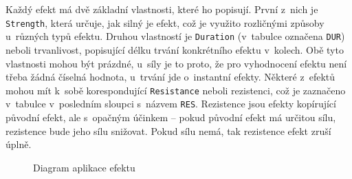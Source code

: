 Každý efekt má dvě základní vlastnosti, které ho popisují. První z~nich je \texttt{Strength}, která určuje, jak silný je efekt, což je využito rozličnými způsoby u~různých typů efektu. Druhou vlastností je \texttt{Duration} (v~tabulce označena \texttt{DUR}) neboli trvanlivost, popisující délku trvání konkrétního efektu v~kolech. Obě tyto vlastnosti mohou být prázdné, u~síly je to proto, že pro vyhodnocení efektu není třeba žádná číselná hodnota, u~trvání jde o~instantní efekty. Některé z~efektů mohou mít k~sobě korespondující \texttt{Resistance} neboli rezistenci, což je zaznačeno v~tabulce v~posledním sloupci s~názvem \texttt{RES}. Rezistence jsou efekty kopírující původní efekt, ale s~opačným účinkem -- pokud původní efekt má určitou sílu, rezistence bude jeho sílu snižovat. Pokud sílu nemá, tak rezistence efekt zruší úplně.

\begin{figure}[h]
    \centering
    \caption{Diagram aplikace efektu}
    \label{diag:apply_effect}
\end{figure}

